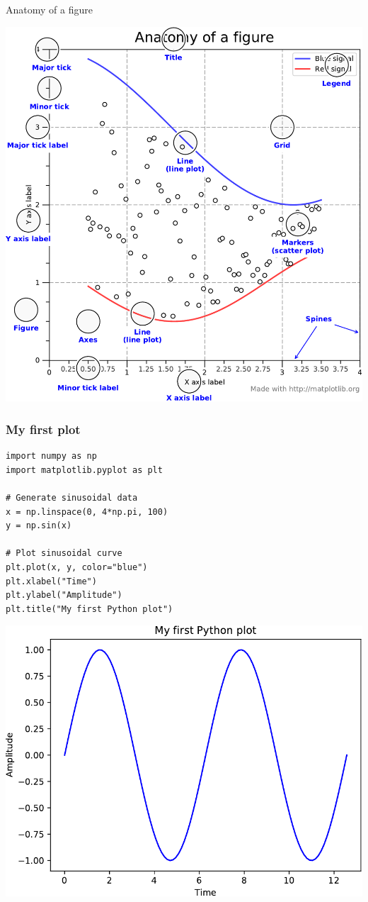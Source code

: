 \documentclass[xcolor=table]{beamer}
\begin{document}
\begin{frame}{Anatomy of a figure}

\begin{center}
	\includegraphics[width=.6\textwidth]{anatomy_figure.pdf}
\end{center}
\end{frame}

\begin{frame}[fragile]
\frametitle{My first plot}

\begin{lstlisting}[style=python]
import numpy as np
import matplotlib.pyplot as plt

# Generate sinusoidal data
x = np.linspace(0, 4*np.pi, 100)
y = np.sin(x)

# Plot sinusoidal curve
plt.plot(x, y, color="blue")
plt.xlabel("Time")
plt.ylabel("Amplitude")
plt.title("My first Python plot")
\end{lstlisting}

\vspace{-0.5cm}
\begin{center}
	\includegraphics[width=.35\textwidth]{plot1.pdf}
\end{center}

\end{frame}
\end{document}
